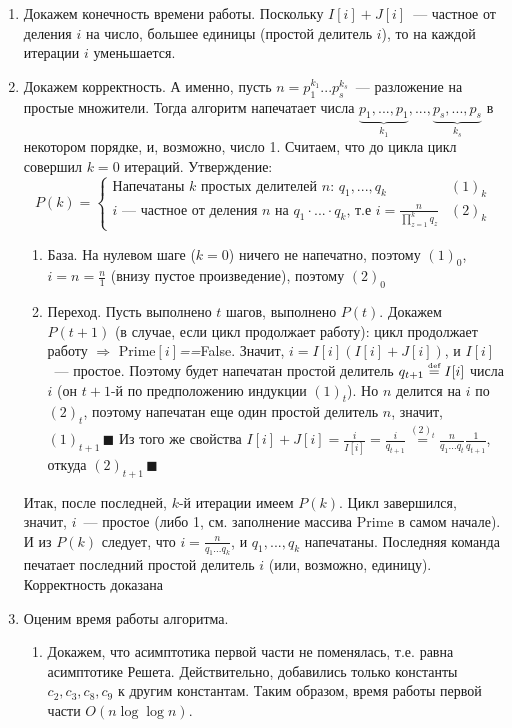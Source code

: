 \documentclass[a4paper]{article}
\def\eqdef{\overset{\mbox{\tiny def}}{=}}
\begin{document}
\begin{enumerate}
\item Докажем конечность времени работы. Поскольку $I[i]+J[i]$~--- частное от деления $i$ на число, большее единицы (простой делитель $i$), то на каждой итерации $i$ уменьшается.
\item Докажем корректность. А именно, пусть $n=p_1^{k_1}...p_s^{k_s}$~--- разложение на простые множители. Тогда алгоритм напечатает числа $\underbrace{p_1,...,p_1}_{k_1},...,\underbrace{p_s,...,p_s}_{k_s}$ в некотором порядке, и, возможно, число 1.\newline
Считаем, что до цикла цикл совершил $k=0$ итераций. Утверждение:
$$P(k)=\begin{cases}
\mbox{Напечатаны $k$ простых делителей $n$: $q_1,...,q_k$} & (1)_k\\
i\mbox{~--- частное от деления }n\mbox{ на }q_1\cdot...\cdot q_k\mbox{, т.е }i=\frac{n}{\prod\limits_{z=1}^k q_z} & (2)_k
\end{cases}$$
\begin{enumerate}
\item База. На нулевом шаге ($k=0$) ничего не напечатно, поэтому $(1)_0$, $i=n=\frac{n}{1}$ (внизу пустое произведение), поэтому $(2)_0$
\item Переход. Пусть выполнено $t$ шагов, выполнено $P(t)$. Докажем $P(t+1)$ (в случае, если цикл продолжает работу): цикл продолжает работу $\Rightarrow$ $\mbox{Prime}[i]$\emph{==}False. Значит, $i=I[i](I[i]+J[i])$, и $I[i]$~--- простое. Поэтому будет напечатан простой делитель $q_{t+1}\eqdef I[i]$ числа $i$ (он $t+1$-й по предположению индукции $(1)_t$). Но $n$ делится на $i$ по $(2)_t$, поэтому напечатан еще один простой делитель $n$, значит, $(1)_{t+1}\,\blacksquare$\newline
Из того же свойства $I[i]+J[i]=\frac{i}{I[i]}=\frac{i}{q_{t+1}}\overset{(2)_t}{=}\frac{n}{q_1...q_t}\frac{1}{q_{t+1}}$, откуда $(2)_{t+1}\,\blacksquare$
\end{enumerate}
Итак, после последней, $k$-й итерации имеем $P(k)$. Цикл завершился, значит, $i$~--- простое (либо 1, см. заполнение массива Prime в самом начале). И из $P(k)$ следует, что $i=\frac{n}{q_1...q_k}$, и $q_1,...,q_k$ напечатаны. Последняя команда печатает последний простой делитель $i$ (или, возможно, единицу). Корректность доказана
\item Оценим время работы алгоритма.
\begin{enumerate}
\item Докажем, что асимптотика первой части не поменялась, т.е. равна асимптотике Решета. Действительно, добавились только константы $c_2,c_3,c_8,c_9$ к другим константам. Таким образом, время работы первой части $O(n\log\log n)$.

\end{enumerate}
\end{enumerate}
\end{document}
